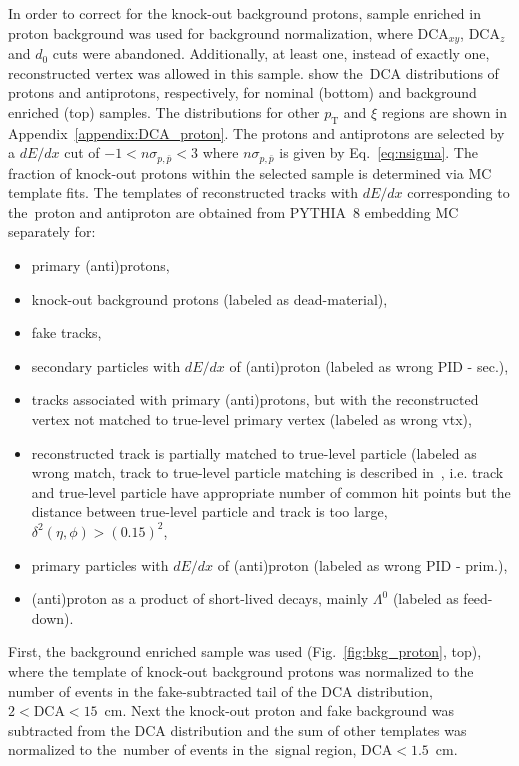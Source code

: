 In order to correct for the knock-out background protons, sample enriched in proton background  was used for background normalization, where $\textrm{DCA}_{xy}$, $\textrm{DCA}_z$ and $d_0$ cuts were abandoned. Additionally, at least one, instead of exactly one,  reconstructed vertex was allowed in this sample.   show the~$\textrm{DCA}$ distributions of protons and antiprotons, respectively, for  nominal (bottom) and background enriched (top) samples. The distributions for other $p_\textrm{T}$ and $\xi$ regions are shown in Appendix~\ref{appendix:DCA_proton}.
The protons and antiprotons are selected by a $dE/dx$ cut of $-1 < n\sigma_{p,\bar{p}} < 3$ where $n\sigma_{p,\bar{p}}$ is given by Eq.~\eqref{eq:nsigma}. The fraction of knock-out protons within the selected sample is determined via \ac{MC} template fits. The templates of reconstructed tracks with $dE/dx$ corresponding to the~proton and antiproton are obtained from PYTHIA~8 embedding \ac{MC} separately for:
\begin{itemize}
	\item primary (anti)protons,
	\item knock-out background protons (labeled as dead-material),
	\item fake tracks,
	\item secondary particles with $dE/dx$ of (anti)proton (labeled as wrong PID - sec.),
	\item tracks associated with primary (anti)protons, but with the reconstructed vertex  not matched to true-level primary vertex (labeled as wrong vtx),
	\item reconstructed track is partially matched to true-level particle (labeled as wrong match, track to true-level particle matching is described in~\cite{supplementaryNote}, i.e.  track and true-level particle have appropriate number of common hit points but the distance between true-level particle and track is too large, $\delta^2\left(\eta,\phi\right)>\left(0.15\right)^2$, 
	\item primary particles with $dE/dx$ of (anti)proton (labeled as wrong PID - prim.),
	\item (anti)proton as a product of short-lived decays, mainly $\Lambda^0$ (labeled as feed-down).
\end{itemize}



First, the background enriched sample was used  (Fig.~\ref{fig:bkg_proton}, top), where the template of knock-out background protons was normalized to the number of events in the fake-subtracted tail of the $\textrm{DCA}$ distribution, $2<\textrm{DCA}<15$~cm. Next the knock-out proton and fake background was subtracted from the $\textrm{DCA}$ distribution and the sum of other templates was normalized to the~number of events in the~signal region,  $\textrm{DCA}<1.5$~cm. 

